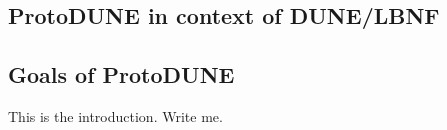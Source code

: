 
\subsection{ProtoDUNE in context of DUNE/LBNF}

\subsection{Goals of ProtoDUNE}

This is the introduction.  Write me.
